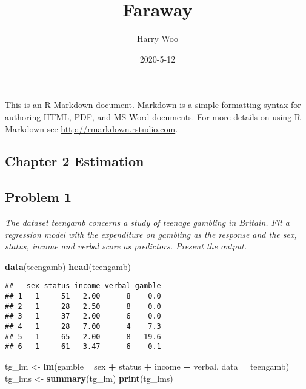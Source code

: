 \documentclass[
]{article}
\title{Faraway}
\author{Harry Woo}
\date{2020-5-12}
\newenvironment{Shaded}{\begin{snugshade}}{\end{snugshade}}
\newcommand{\DataTypeTok}[1]{\textcolor[rgb]{0.13,0.29,0.53}{#1}}
\newcommand{\KeywordTok}[1]{\textcolor[rgb]{0.13,0.29,0.53}{\textbf{#1}}}
\newcommand{\NormalTok}[1]{#1}
\newcommand{\OperatorTok}[1]{\textcolor[rgb]{0.81,0.36,0.00}{\textbf{#1}}}
\newcommand{\StringTok}[1]{\textcolor[rgb]{0.31,0.60,0.02}{#1}}
\begin{document}
\maketitle

This is an R Markdown document. Markdown is a simple formatting syntax
for authoring HTML, PDF, and MS Word documents. For more details on
using R Markdown see \url{http://rmarkdown.rstudio.com}.

\hypertarget{chapter-2-estimation}{%
\subsection{Chapter 2 Estimation}\label{chapter-2-estimation}}

\hypertarget{problem-1}{%
\subsection{Problem 1}\label{problem-1}}

\emph{The dataset teengamb concerns a study of teenage gambling in
Britain. Fit a regression model with the expenditure on gambling as the
response and the sex, status, income and verbal score as predictors.
Present the output.}

\begin{Shaded}
\begin{Highlighting}[]
\KeywordTok{data}\NormalTok{(teengamb)}
\KeywordTok{head}\NormalTok{(teengamb)}
\end{Highlighting}
\end{Shaded}

\begin{verbatim}
##   sex status income verbal gamble
## 1   1     51   2.00      8    0.0
## 2   1     28   2.50      8    0.0
## 3   1     37   2.00      6    0.0
## 4   1     28   7.00      4    7.3
## 5   1     65   2.00      8   19.6
## 6   1     61   3.47      6    0.1
\end{verbatim}

\begin{Shaded}
\begin{Highlighting}[]
\NormalTok{tg_lm <-}\StringTok{  }\KeywordTok{lm}\NormalTok{(gamble }\OperatorTok{~}\StringTok{ }\NormalTok{sex }\OperatorTok{+}\StringTok{ }\NormalTok{status }\OperatorTok{+}\StringTok{ }\NormalTok{income }\OperatorTok{+}\StringTok{ }\NormalTok{verbal, }\DataTypeTok{data =}\NormalTok{ teengamb)}
\NormalTok{tg_lms <-}\StringTok{ }\KeywordTok{summary}\NormalTok{(tg_lm)}
\KeywordTok{print}\NormalTok{(tg_lms)}
\end{Highlighting}
\end{Shaded}
\end{document}
